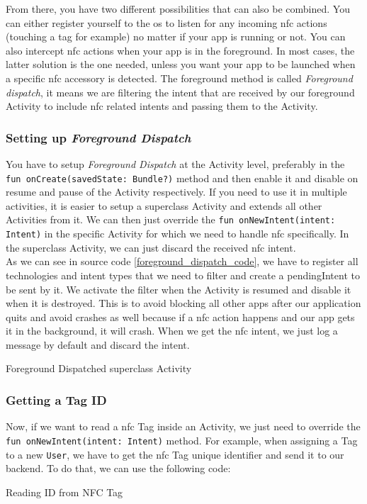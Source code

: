 \documentclass[twoside, openright,11pt,a4paper]{book}
\newenvironment{code}{\captionsetup{type=listing}}{}
\begin{document}
From there, you have two different possibilities that can also be combined. You can either register yourself to the \gls{os} to listen for any incoming \gls{nfc} actions (touching a tag for example) no matter if your app is running or not. You can also intercept \gls{nfc} actions when your app is in the foreground. In most cases, the latter solution is the one needed, unless you want your app to be launched when a specific \gls{nfc} accessory is detected. The foreground method is called \emph{Foreground dispatch}, it means we are filtering the intent that are received by our foreground Activity to include \gls{nfc} related intents and passing them to the Activity.

\subsubsection{Setting up \emph{Foreground Dispatch}}
You have to setup \emph{Foreground Dispatch}\cite{android:doc:nfc_foregroundDispatch} at the Activity level, preferably in the \texttt{fun onCreate(savedState: Bundle?)} method and then enable it and disable on resume and pause of the Activity respectively. If you need to use it in multiple activities, it is easier to setup a superclass Activity and extends all other Activities from it. We can then just override the \texttt{fun onNewIntent(intent: Intent)} in the specific Activity for which we need to handle \gls{nfc} specifically. In the superclass Activity, we can just discard the received \gls{nfc} intent.\\

As we can see in source code \ref{foreground_dispatch_code}, we have to register all technologies and intent types that we need to filter and create a pendingIntent to be sent by it. We activate the filter when the Activity is resumed and disable it when it is destroyed. This is to avoid blocking all other apps after our application quits and avoid crashes as well because if a \gls{nfc} action happens and our app gets it in the background, it will crash. When we get the \gls{nfc} intent, we just log a message by default and discard the intent.

\begin{code}
	\caption{Foreground Dispatched superclass Activity}
	\label{foreground_dispatch_code}
\end{code}
\subsubsection{Getting a Tag ID}
Now, if we want to read a \gls{nfc} Tag inside an Activity, we just need to override the \texttt{fun onNewIntent(intent: Intent)} method. For example, when assigning a Tag to a new \verb+User+, we have to get the \gls{nfc} Tag unique identifier and send it to our backend. To do that, we can use the following code:
\begin{code}
	\caption{Reading ID from NFC Tag}
\end{code}
\end{document}
